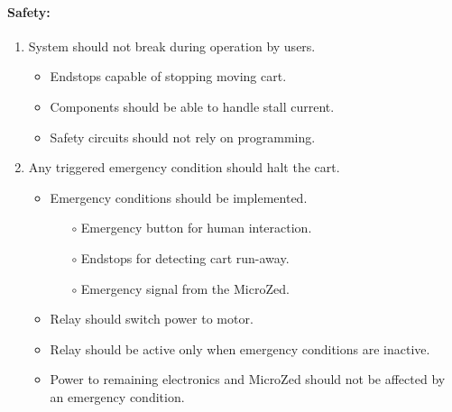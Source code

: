 \paragraph{Safety:}
\begin{enumerate}[resume]
	\item System should not break during operation by users.
	\label{enum:not_break_mis}
	\begin{itemize}
		\item Endstops capable of stopping moving cart.
		\item Components should be able to handle stall current.
		\item Safety circuits should not rely on programming.
	\end{itemize}

	\item Any triggered emergency condition should halt the cart.
	\label{enum:any_trigger_em}
		\begin{itemize}
			\item Emergency conditions should be implemented.
			\begin{itemize}
				\item[$\circ$] Emergency button for human interaction.
				\item[$\circ$] Endstops for detecting cart run-away.
				\item[$\circ$] Emergency signal from the MicroZed.
			\end{itemize}
			\item Relay should switch power to motor.
			\item Relay should be active only when emergency conditions are inactive.
			\item Power to remaining electronics and MicroZed should not be affected by an emergency condition.
		\end{itemize}
\end{enumerate}
